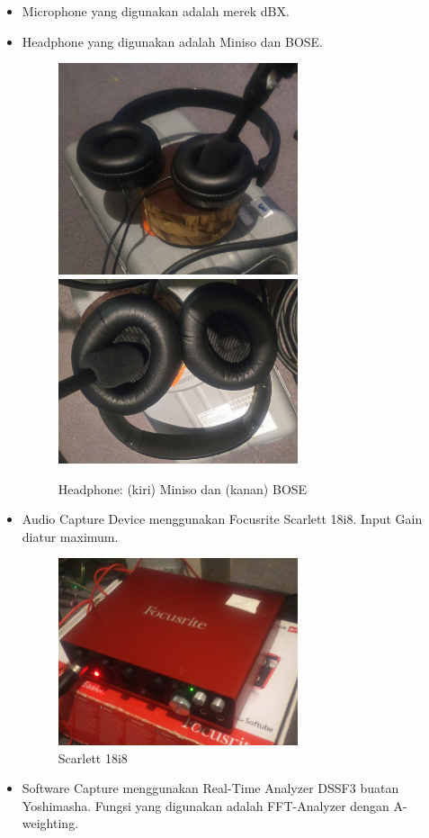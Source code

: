\documentclass[12pt,]{article}
\begin{document}
	\begin{itemize}
		\item Microphone yang digunakan adalah merek dBX.
		\item Headphone yang digunakan adalah Miniso dan BOSE.
		\begin{figure}[!ht]
			\centering
			\includegraphics[width=200pt]{images/foto/miniso}
			\includegraphics[width=200pt]{images/foto/bose}
			\caption{Headphone: (kiri) Miniso dan (kanan) BOSE}
		\end{figure}
		\item Audio Capture Device menggunakan Focusrite Scarlett 18i8.
		Input Gain diatur maximum.
		\begin{figure}[!ht]
			\centering
			\includegraphics[width=200pt]{images/foto/capture}
			\caption{Scarlett 18i8}
		\end{figure}
	
		\item Software Capture menggunakan Real-Time Analyzer DSSF3 buatan Yoshimasha.
		Fungsi yang digunakan adalah FFT-Analyzer dengan A-weighting.
		
	\end{itemize}
\end{document}
